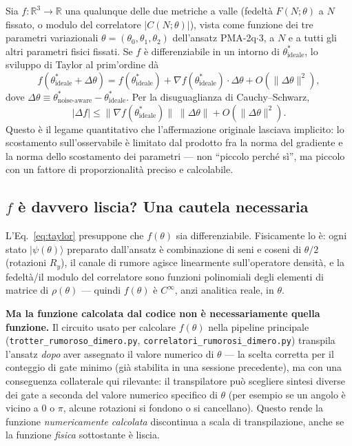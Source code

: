 \documentclass[11pt,a4paper]{article}
\newcommand{\ket}[1]{\lvert #1 \rangle}
\begin{document}
Sia $f:\mathbb R^3\to\mathbb R$ una qualunque delle due metriche a valle
(fedeltà $F(N;\theta)$ a $N$ fissato, o modulo del correlatore
$|C(N;\theta)|$), vista come funzione dei tre parametri variazionali
$\theta=(\theta_0,\theta_1,\theta_2)$ dell'ansatz PMA-2q$\cdot$3, a $N$ e
a tutti gli altri parametri fisici fissati. Se $f$ è differenziabile in
un intorno di $\theta^*_\text{ideale}$, lo sviluppo di Taylor al prim'ordine dà
\begin{equation}
f(\theta^*_\text{ideale}+\Delta\theta) = f(\theta^*_\text{ideale}) +
\nabla f(\theta^*_\text{ideale})\cdot\Delta\theta + O(\|\Delta\theta\|^2),
\label{eq:taylor}
\end{equation}
dove $\Delta\theta\equiv\theta^*_\text{noise-aware}-\theta^*_\text{ideale}$.
Per la disuguaglianza di Cauchy--Schwarz,
\begin{equation}
|\Delta f| \le \|\nabla f(\theta^*_\text{ideale})\|\;\|\Delta\theta\| +
O(\|\Delta\theta\|^2).
\label{eq:bound}
\end{equation}
Questo è il legame quantitativo che l'affermazione originale lasciava
implicito: lo scostamento sull'osservabile è limitato dal prodotto fra la
norma del gradiente e la norma dello scostamento dei parametri --- non
``piccolo perché sì'', ma piccolo con un fattore di proporzionalità
preciso e calcolabile.

\subsection{$f$ è davvero liscia? Una cautela necessaria}
\label{sec:cautela-liscezza}

L'Eq.~\eqref{eq:taylor} presuppone che $f(\theta)$ sia differenziabile.
Fisicamente lo è: ogni stato $\ket{\psi(\theta)}$ preparato dall'ansatz è
combinazione di seni e coseni di $\theta/2$ (rotazioni $R_y$), il canale
di rumore agisce linearmente sull'operatore densità, e la fedeltà/il
modulo del correlatore sono funzioni polinomiali degli elementi di
matrice di $\rho(\theta)$ --- quindi $f(\theta)$ è $C^\infty$, anzi
analitica reale, in $\theta$.

\textbf{Ma la funzione calcolata dal codice non è necessariamente quella
funzione.} Il circuito usato per calcolare $f(\theta)$ nella pipeline
principale (\texttt{trotter\_rumoroso\_dimero.py},
\texttt{correlatori\_rumorosi\_dimero.py}) transpila l'ansatz \emph{dopo}
aver assegnato il valore numerico di $\theta$ --- la scelta corretta per
il conteggio di gate minimo (già stabilita in una sessione precedente),
ma con una conseguenza collaterale qui rilevante: il transpilatore può
scegliere sintesi diverse dei gate a seconda del valore numerico
specifico di $\theta$ (per esempio se un angolo è vicino a $0$ o $\pi$,
alcune rotazioni si fondono o si cancellano). Questo rende la funzione
\emph{numericamente calcolata} discontinua a scala di transpilazione,
anche se la funzione \emph{fisica} sottostante è liscia.
\end{document}
